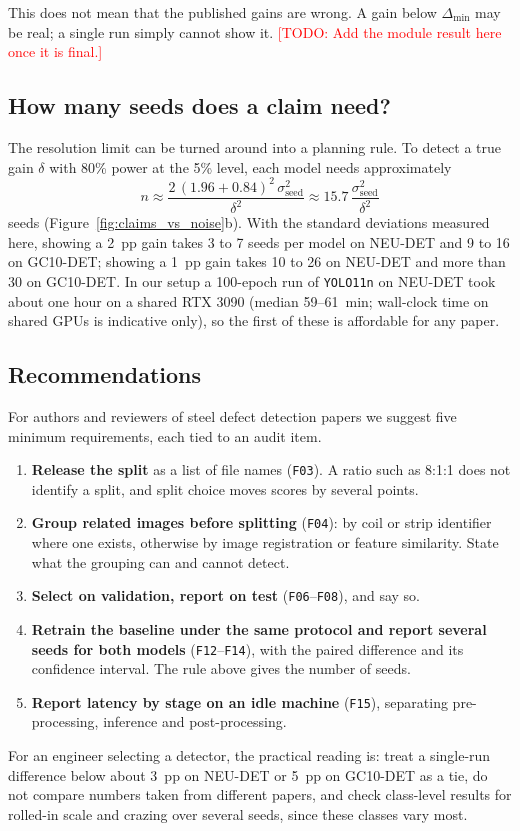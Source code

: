 \documentclass[pdflatex,sn-apa]{sn-jnl}
\newcommand{\todo}[1]{\textcolor{red}{[TODO: #1]}}
\begin{document}
This does not mean that the published gains are wrong. A gain below $\Delta_{\min}$ may be real; a single run simply cannot show it. \todo{Add the module result here once it is final.}

\subsection{How many seeds does a claim need?}
The resolution limit can be turned around into a planning rule. To detect a true gain $\delta$ with 80\% power at the 5\% level, each model needs approximately
\begin{equation}
n \approx \frac{2\,(1.96+0.84)^{2}\,\sigma_{\text{seed}}^{2}}{\delta^{2}} \approx 15.7\,\frac{\sigma_{\text{seed}}^{2}}{\delta^{2}}
\end{equation}
seeds (Figure~\ref{fig:claims_vs_noise}b). With the standard deviations measured here, showing a 2~pp gain takes 3 to 7 seeds per model on NEU-DET and 9 to 16 on GC10-DET; showing a 1~pp gain takes 10 to 26 on NEU-DET and more than 30 on GC10-DET. In our setup a 100-epoch run of \texttt{YOLO11n} on NEU-DET took about one hour on a shared RTX 3090 (median 59--61~min; wall-clock time on shared GPUs is indicative only), so the first of these is affordable for any paper.

\subsection{Recommendations}
For authors and reviewers of steel defect detection papers we suggest five minimum requirements, each tied to an audit item.
\begin{enumerate}[leftmargin=2em, itemsep=0.1em]
    \item \textbf{Release the split} as a list of file names (\texttt{F03}). A ratio such as 8:1:1 does not identify a split, and split choice moves scores by several points.
    \item \textbf{Group related images before splitting} (\texttt{F04}): by coil or strip identifier where one exists, otherwise by image registration or feature similarity. State what the grouping can and cannot detect.
    \item \textbf{Select on validation, report on test} (\texttt{F06}--\texttt{F08}), and say so.
    \item \textbf{Retrain the baseline under the same protocol and report several seeds for both models} (\texttt{F12}--\texttt{F14}), with the paired difference and its confidence interval. The rule above gives the number of seeds.
    \item \textbf{Report latency by stage on an idle machine} (\texttt{F15}), separating pre-processing, inference and post-processing.
\end{enumerate}
For an engineer selecting a detector, the practical reading is: treat a single-run difference below about 3~pp on NEU-DET or 5~pp on GC10-DET as a tie, do not compare numbers taken from different papers, and check class-level results for rolled-in scale and crazing over several seeds, since these classes vary most.
\end{document}
